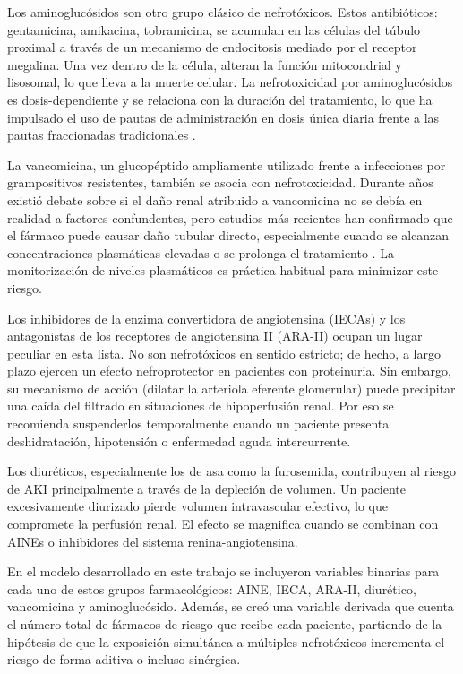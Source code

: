 \documentclass[12pt, a4paper, oneside]{report}
\begin{document}
Los aminoglucósidos son otro grupo clásico de nefrotóxicos. Estos antibióticos: gentamicina, amikacina, tobramicina, se acumulan en las células del túbulo proximal a través de un mecanismo de endocitosis mediado por el receptor megalina. Una vez dentro de la célula, alteran la función mitocondrial y lisosomal, lo que lleva a la muerte celular. La nefrotoxicidad por aminoglucósidos es dosis-dependiente y se relaciona con la duración del tratamiento, lo que ha impulsado el uso de pautas de administración en dosis única diaria frente a las pautas fraccionadas tradicionales \parencite{perazella2022drugaki}.

La vancomicina, un glucopéptido ampliamente utilizado frente a infecciones por grampositivos resistentes, también se asocia con nefrotoxicidad. Durante años existió debate sobre si el daño renal atribuido a vancomicina no se debía en realidad a factores confundentes, pero estudios más recientes han confirmado que el fármaco puede causar daño tubular directo, especialmente cuando se alcanzan concentraciones plasmáticas elevadas o se prolonga el tratamiento \parencite{pais2020vancomycin}. La monitorización de niveles plasmáticos es práctica habitual para minimizar este riesgo.

Los inhibidores de la enzima convertidora de angiotensina (IECAs) y los antagonistas de los receptores de angiotensina II (ARA-II) ocupan un lugar peculiar en esta lista. No son nefrotóxicos en sentido estricto; de hecho, a largo plazo ejercen un efecto nefroprotector en pacientes con proteinuria. Sin embargo, su mecanismo de acción (dilatar la arteriola eferente glomerular) puede precipitar una caída del filtrado en situaciones de hipoperfusión renal. Por eso se recomienda suspenderlos temporalmente cuando un paciente presenta deshidratación, hipotensión o enfermedad aguda intercurrente.

Los diuréticos, especialmente los de asa como la furosemida, contribuyen al riesgo de AKI principalmente a través de la depleción de volumen. Un paciente excesivamente diurizado pierde volumen intravascular efectivo, lo que compromete la perfusión renal. El efecto se magnifica cuando se combinan con AINEs o inhibidores del sistema renina-angiotensina.

En el modelo desarrollado en este trabajo se incluyeron variables binarias para cada uno de estos grupos farmacológicos: AINE, IECA, ARA-II, diurético, vancomicina y aminoglucósido. Además, se creó una variable derivada que cuenta el número total de fármacos de riesgo que recibe cada paciente, partiendo de la hipótesis de que la exposición simultánea a múltiples nefrotóxicos incrementa el riesgo de forma aditiva o incluso sinérgica.
\end{document}
